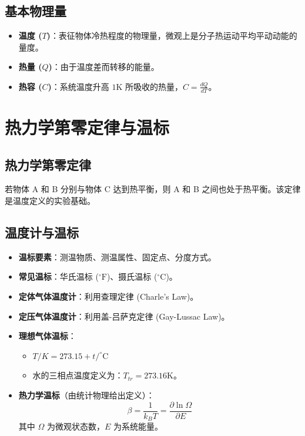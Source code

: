 \documentclass{article}
\begin{document}
\subsection{基本物理量}
\begin{itemize}
    \item \textbf{温度 ($T$)}：表征物体冷热程度的物理量，微观上是分子热运动平均平动动能的量度。
    \item \textbf{热量 ($Q$)}：由于温度差而转移的能量。
    \item \textbf{热容 ($C$)}：系统温度升高 $1\text{K}$ 所吸收的热量，$C = \frac{dQ}{dT}$。
\end{itemize}

\section{热力学第零定律与温标}

\subsection{热力学第零定律}
若物体 A 和 B 分别与物体 C 达到热平衡，则 A 和 B 之间也处于热平衡。该定律是温度定义的实验基础。

\subsection{温度计与温标}
\begin{itemize}
    \item \textbf{温标要素}：测温物质、测温属性、固定点、分度方式。
    \item \textbf{常见温标}：华氏温标 ($^\circ\text{F}$)、摄氏温标 ($^\circ\text{C}$)。
    \item \textbf{定体气体温度计}：利用查理定律 (Charle's Law)。
    \item \textbf{定压气体温度计}：利用盖-吕萨克定律 (Gay-Lussac Law)。
    \item \textbf{理想气体温标}：
    \begin{itemize}
        \item $T/K = 273.15 + t/^\circ\text{C}$
        \item 水的三相点温度定义为：$T_{tr} = 273.16\text{K}$。
    \end{itemize}
    \item \textbf{热力学温标}（由统计物理给出定义）：
    \[ \beta = \frac{1}{k_B T} = \frac{\partial \ln \Omega}{\partial E} \]
    其中 $\Omega$ 为微观状态数，$E$ 为系统能量。
\end{itemize}
\end{document}
